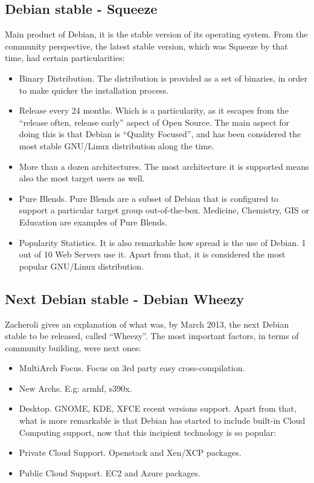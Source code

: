 \documentclass[11pt]{article}
\begin{document}
\subsection{Debian stable - Squeeze}
Main product of Debian, it is the stable version of its operating system. From the community perspective, the latest stable version, which was Squeeze by that time, had certain particularities:
\begin{itemize}\itemsep0pt
\item{Binary Distribution}. The distribution is provided as a set of binaries, in order to make quicker the installation process.
\item{Release every 24 months}. Which is a particularity, as it escapes from the ``release often, release early'' aspect of Open Source. The main aspect for doing this is that Debian is ``Quality Focused'', and has been considered the most stable GNU/Linux distribution along the time.
\item{More than a dozen architectures}. The most architecture it is supported means also the most target users as well.
\item{Pure Blends}. Pure Blends are a subset of Debian that is configured to support a particular target group out-of-the-box. Medicine, Chemistry, GIS or Education are examples of Pure Blends.
\item{Popularity Statistics}. It is also remarkable how spread is the use of Debian. 1 out of 10 Web Servers use it. Apart from that, it is considered the most popular GNU/Linux distribution.
\end{itemize}

\subsection{Next Debian stable - Debian Wheezy}
Zacheroli gives an explanation of what was, by March 2013, the next Debian stable to be released, called ``Wheezy''. The most important factors, in terms of community building, were next ones:
\begin{itemize}\itemsep0pt
\item{MultiArch Focus}. Focus on 3rd party easy cross-compilation.
\item{New Archs}. E.g: armhf, s390x.
\item{Desktop}. GNOME, KDE, XFCE recent versions support.
Apart from that, what is more remarkable is that Debian has started to include built-in Cloud Computing support, now that this incipient technology is so popular:
\item{Private Cloud Support}. Openstack and Xen/XCP packages.
\item{Public Cloud Support}. EC2 and Azure packages.
\end{itemize}
\end{document}
